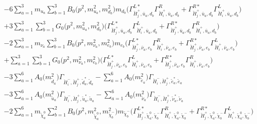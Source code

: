 \begin{itemize}
\begin{align}
 &-6 \sum_{a=1}^{3}m_{u_{{a}}} \sum_{b=1}^{3}{B_0\Big(p^{2},m^2_{u_{{a}}},m^2_{d_{{b}}}\Big)} m_{d_{{b}}} \Big({\Gamma^{L*}_{\check{H}^+_{{j}},\bar{u}_{{a}},d_{{b}}}} {\Gamma^R_{\check{H}^+_{{i}},\bar{u}_{{a}},d_{{b}}}}  + {\Gamma^{R*}_{\check{H}^+_{{j}},\bar{u}_{{a}},d_{{b}}}} {\Gamma^L_{\check{H}^+_{{i}},\bar{u}_{{a}},d_{{b}}}} \Big)  \nonumber \\ 
 &+3 \sum_{a=1}^{3}\sum_{b=1}^{3}{G_0\Big(p^{2},m^2_{u_{{a}}},m^2_{d_{{b}}}\Big)} \Big({\Gamma^{L*}_{\check{H}^+_{{j}},\bar{u}_{{a}},d_{{b}}}} {\Gamma^L_{\check{H}^+_{{i}},\bar{u}_{{a}},d_{{b}}}}  + {\Gamma^{R*}_{\check{H}^+_{{j}},\bar{u}_{{a}},d_{{b}}}} {\Gamma^R_{\check{H}^+_{{i}},\bar{u}_{{a}},d_{{b}}}} \Big) \nonumber \\ 
 &-2 \sum_{a=1}^{3}m_{\nu_{{a}}} \sum_{b=1}^{3}{B_0\Big(p^{2},m^2_{\nu_{{a}}},m^2_{e_{{b}}}\Big)} m_{e_{{b}}} \Big({\Gamma^{L*}_{\check{H}^+_{{j}},\bar{\nu}_{{a}},e_{{b}}}} {\Gamma^R_{\check{H}^+_{{i}},\bar{\nu}_{{a}},e_{{b}}}}  + {\Gamma^{R*}_{\check{H}^+_{{j}},\bar{\nu}_{{a}},e_{{b}}}} {\Gamma^L_{\check{H}^+_{{i}},\bar{\nu}_{{a}},e_{{b}}}} \Big)  \nonumber \\ 
 &+\sum_{a=1}^{3}\sum_{b=1}^{3}{G_0\Big(p^{2},m^2_{\nu_{{a}}},m^2_{e_{{b}}}\Big)} \Big({\Gamma^{L*}_{\check{H}^+_{{j}},\bar{\nu}_{{a}},e_{{b}}}} {\Gamma^L_{\check{H}^+_{{i}},\bar{\nu}_{{a}},e_{{b}}}}  + {\Gamma^{R*}_{\check{H}^+_{{j}},\bar{\nu}_{{a}},e_{{b}}}} {\Gamma^R_{\check{H}^+_{{i}},\bar{\nu}_{{a}},e_{{b}}}} \Big)\nonumber \\ 
 &-3 \sum_{a=1}^{6}{A_0\Big(m^2_{\tilde{d}_{{a}}}\Big)} {\Gamma_{\check{H}^-_{{i}},\check{H}^+_{{j}},\tilde{d}^*_{{a}},\tilde{d}_{{a}}}}  - \sum_{a=1}^{6}{A_0\Big(m^2_{\tilde{e}_{{a}}}\Big)} {\Gamma_{\check{H}^-_{{i}},\check{H}^+_{{j}},\tilde{e}^*_{{a}},\tilde{e}_{{a}}}}  \nonumber \\ 
 &-3 \sum_{a=1}^{6}{A_0\Big(m^2_{\tilde{u}_{{a}}}\Big)} {\Gamma_{\check{H}^-_{{i}},\check{H}^+_{{j}},\tilde{u}^*_{{a}},\tilde{u}_{{a}}}}  - \sum_{a=1}^{6}{A_0\Big(m^2_{\tilde{\nu}_{{a}}}\Big)} {\Gamma_{\check{H}^-_{{i}},\check{H}^+_{{j}},\tilde{\nu}^*_{{a}},\tilde{\nu}_{{a}}}}  \nonumber \\ 
 &-2 \sum_{a=1}^{6}m_{\tilde{\chi}^0_{{a}}} \sum_{b=1}^{2}{B_0\Big(p^{2},m^2_{\tilde{\chi}^0_{{a}}},m^2_{\tilde{\chi}^-_{{b}}}\Big)} m_{\tilde{\chi}^-_{{b}}} \Big({\Gamma^{L*}_{\check{H}^+_{{j}},\tilde{\chi}^0_{{a}},\tilde{\chi}^-_{{b}}}} {\Gamma^R_{\check{H}^+_{{i}},\tilde{\chi}^0_{{a}},\tilde{\chi}^-_{{b}}}}  + {\Gamma^{R*}_{\check{H}^+_{{j}},\tilde{\chi}^0_{{a}},\tilde{\chi}^-_{{b}}}} {\Gamma^L_{\check{H}^+_{{i}},\tilde{\chi}^0_{{a}},\tilde{\chi}^-_{{b}}}} \Big)  \nonumber \\ 

\end{align}
\end{itemize}
